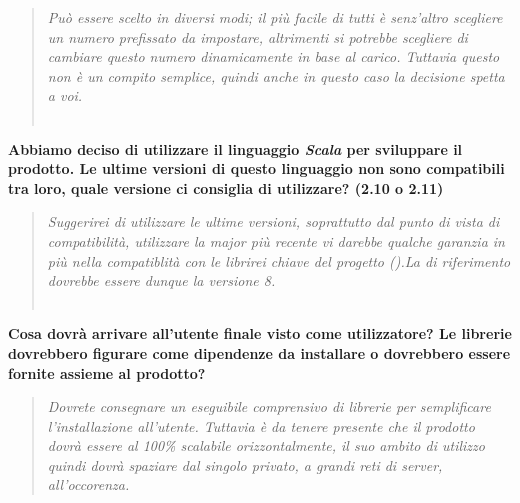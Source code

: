 \documentclass{scalatekids-article}
\begin{document}
\begin{quote}
  \textit{Può essere scelto in diversi modi; il più facile di tutti è senz'altro scegliere un numero prefissato da impostare, altrimenti si potrebbe scegliere di cambiare questo numero dinamicamente in base al carico. Tuttavia questo non è un compito semplice, quindi anche in questo caso la decisione spetta a voi.\\ \\}
\end{quote}
\textbf{Abbiamo deciso di utilizzare il linguaggio \textit{Scala} per sviluppare il prodotto. Le ultime versioni di questo linguaggio non sono compatibili tra loro, quale versione ci consiglia di utilizzare? (2.10 o 2.11)}
\begin{quote}
  \textit{Suggerirei di utilizzare le ultime versioni, soprattutto dal punto di
    vista di compatibilità, utilizzare la major più recente vi darebbe qualche
    garanzia in più nella compatiblità con le librirei chiave del progetto
    ().La  di riferimento dovrebbe essere dunque la
    versione 8.\\ \\}
\end{quote}
\textbf{Cosa dovrà arrivare all'utente finale visto come utilizzatore? Le librerie  dovrebbero figurare come dipendenze da installare o dovrebbero essere fornite assieme al prodotto?}
\begin{quote}
  \textit{Dovrete consegnare un eseguibile comprensivo di librerie
     per semplificare l'installazione all'utente. Tuttavia è da
    tenere presente che il prodotto dovrà essere al 100\% scalabile
    orizzontalmente, il suo ambito di utilizzo quindi dovrà spaziare dal singolo
    privato, a grandi reti di server, all'occorenza.}
\end{quote}
\end{document}
